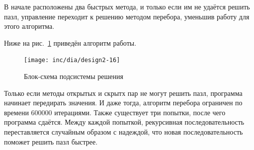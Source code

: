 В начале расположены два быстрых метода, и только если им не удаётся решить пазл, управление переходит к решению методом перебора, уменьшив работу для этого алгоритма. 

Ниже на рис.~\ref{fig:fig23} приведён алгоритм работы. 


\begin{figure}[ht!]
  \centering
  \texttt{[image: inc/dia/design2-16]}
  \caption{Блок-схема подсистемы решения}
  \label{fig:fig23}
\end{figure}

Только если методы открытых и скрытх пар не могут решить пазл, программа начинает передирать значения. И даже тогда, алгоритм перебора ограничен по времени 600000 итерациями. Также существует три попытки, после чего программа сдаётся. Между каждой попыткой, рекурсивная последовательность переставляется случайным образом с надеждой, что новая последовательность поможет решить пазл быстрее. 










